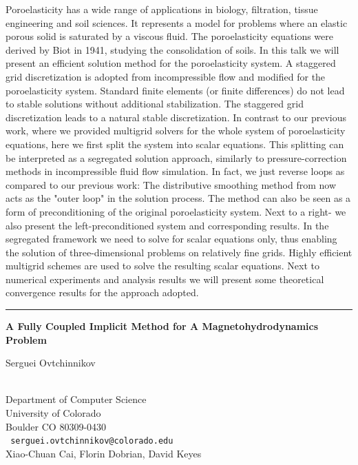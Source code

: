 \documentclass[twosided]{report}
\begin{document}
Poroelasticity has a wide range of applications in biology, filtration,
tissue engineering and soil sciences. It represents a model for
problems where an elastic porous solid is saturated by a viscous fluid.
The poroelasticity equations were derived by Biot in 1941, studying the
consolidation of soils. In this talk we will present an efficient
solution method for the poroelasticity system. A staggered grid
discretization is adopted from incompressible flow and modified for the
poroelasticity system. Standard finite elements (or finite differences)
do not lead to stable solutions without additional stabilization. The
staggered grid discretization leads to a natural stable discretization.
In contrast to our previous work, where we provided multigrid
solvers for the whole system of poroelasticity equations, here we first
split the system into scalar equations. This splitting can be
interpreted as a segregated solution approach, similarly to
pressure-correction methods in incompressible fluid flow simulation. In
fact, we just reverse loops as compared to our previous work: The
distributive smoothing method from now acts as the "outer loop" in
the solution process. The method can also be seen as a form of
preconditioning of the original poroelasticity system. Next to a right-
we also present the left-preconditioned system and corresponding
results. In the segregated framework we need to solve for scalar
equations only, thus enabling the solution of three-dimensional
problems on relatively fine grids. Highly efficient multigrid schemes
are used to solve the resulting scalar equations. Next to numerical
experiments and analysis results we will present some theoretical
convergence results for the approach adopted.

\begin{center}

\rule{6in}{1pt}
\end{center}

\begin{center}
{\large			\label{ovtchinnikov}
{\bf
A Fully Coupled Implicit Method for A Magnetohydrodynamics Problem
}

Serguei Ovtchinnikov} \\
Department of Computer Science \\
University of Colorado \\
Boulder CO 80309-0430
\\ {\tt
serguei.ovtchinnikov@colorado.edu
}
\\
Xiao-Chuan Cai,
Florin Dobrian,
David Keyes
\end{center}
\end{document}
